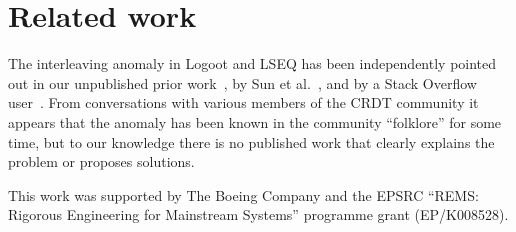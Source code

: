 \documentclass[sigconf]{acmart}
\begin{document}
\section{Related work}\label{sec:relwork}

The interleaving anomaly in Logoot and LSEQ has been independently pointed out in our unpublished prior work~\cite{ExtendedVersion}, by Sun et al.~\cite{Sun:2018wb}, and by a Stack Overflow user~\cite{StackOverflowInterleaving}.
From conversations with various members of the CRDT community it appears that the anomaly has been known in the community ``folklore'' for some time, but to our knowledge there is no published work that clearly explains the problem or proposes solutions.

\begin{acks}
This work was supported by The Boeing Company and the EPSRC ``REMS: Rigorous Engineering for Mainstream Systems'' programme grant (EP/K008528).
\end{acks}



\end{document}
